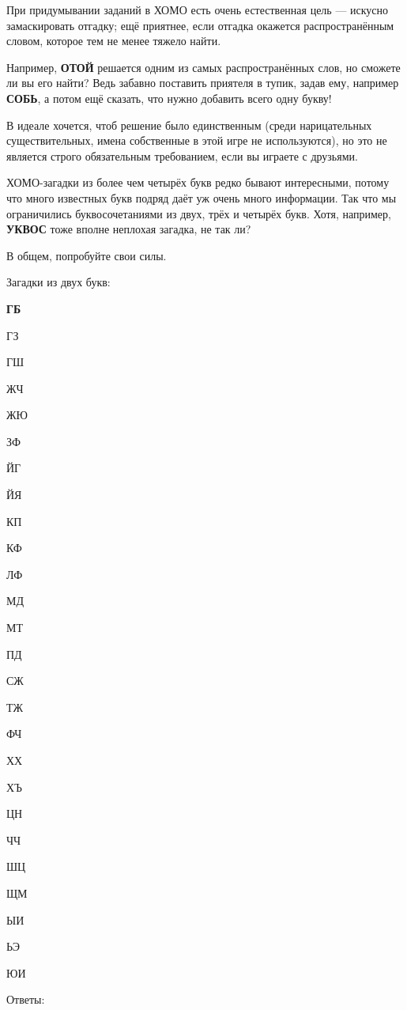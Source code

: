 При придумывании заданий в ХОМО есть очень естественная цель --- искусно замаскировать отгадку;
ещё приятнее, если отгадка окажется распространённым словом, которое тем не менее тяжело найти. 

Например, \textbf{ОТОЙ} решается одним из самых распространённых слов, но сможете ли вы его найти?
Ведь забавно поставить приятеля в тупик, задав ему, например \textbf{СОБЬ}, а потом ещё сказать, что нужно добавить всего одну букву! 

В идеале хочется, чтоб решение было единственным (среди нарицательных существительных, имена собственные в этой игре не используются), но это не является строго обязательным требованием, если вы играете с друзьями.

ХОМО-загадки из более чем четырёх букв редко бывают интересными, потому что много известных букв подряд даёт уж очень много информации.
Так что мы ограничились буквосочетаниями из двух, трёх и четырёх букв.
Хотя, например, \textbf{УКВОС} тоже вполне неплохая загадка, не так ли?

В общем, попробуйте свои силы.

Загадки из двух букв:

\begin{multicols}{4}
{\bf
ГБ

ГЗ

ГШ

ЖЧ

ЖЮ

ЗФ

ЙГ

ЙЯ

КП

КФ

ЛФ

МД

МТ

ПД

СЖ

ТЖ

ФЧ

ХХ

ХЪ

ЦН

ЧЧ

ШЦ

ЩМ

ЫИ

ЬЭ

ЮИ
}
\end{multicols}

Ответы:

